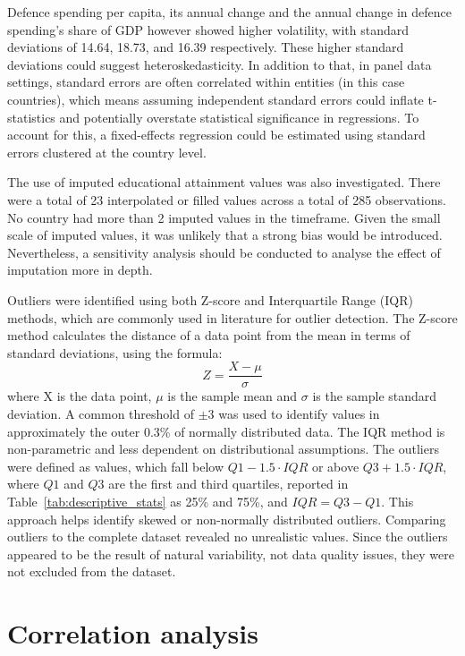 Defence spending per capita, its annual change and the annual change in defence spending's 
share of GDP however showed higher volatility, with standard deviations of 14.64, 18.73, and 
16.39 respectively. These higher standard deviations could suggest heteroskedasticity. In addition 
to that, in panel data settings, standard errors are often correlated within entities (in this case countries), 
which means assuming independent standard errors could inflate t-statistics and potentially 
overstate statistical significance in regressions. To account for this, a fixed-effects 
regression could be estimated using standard errors clustered at the country level.

The use of imputed educational attainment values was also investigated. There were a total 
of 23 interpolated or filled values across a total of 285 observations. No country had
more than 2 imputed values in the timeframe. Given the small scale of imputed values, it was 
unlikely that a strong bias would be introduced. Nevertheless, a sensitivity analysis should 
be conducted to analyse the effect of imputation more in depth.

Outliers were identified using both Z-score and 
Interquartile Range (IQR) methods, which are commonly used in literature for outlier 
detection. The Z-score method calculates the distance of a data point from 
the mean in terms of standard deviations, using the formula:
\begin{equation*}
    Z = \frac{X - \mu}{\sigma}
\end{equation*}
where X is the data point, $\mu$ is the sample mean and $\sigma$ is the sample standard deviation.
A common threshold of $\pm 3$ was used to identify values in approximately the outer 0.3\% of normally 
distributed data.
The IQR method is non-parametric and less dependent on distributional assumptions. The outliers 
were defined as values, which fall below $Q1 - 1.5 \cdot IQR$ or above $Q3 + 1.5 \cdot IQR$, where 
$Q1$ and $Q3$ are the first and third quartiles, reported in Table~\ref{tab:descriptive_stats} as 
25\% and 75\%, and $IQR = Q3 - Q1$. This approach helps identify skewed or non-normally distributed outliers.
Comparing outliers to the complete dataset revealed no unrealistic 
values. Since the outliers appeared to be the result of natural variability, not data 
quality issues, they were not excluded from the dataset. \parencite{barnett_outliers_1994}

\section{Correlation analysis}

